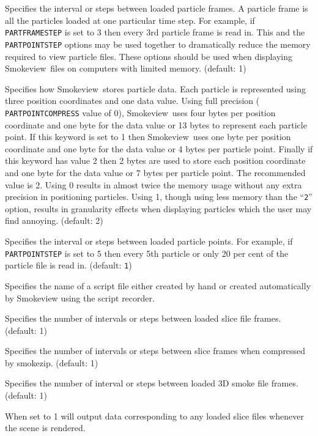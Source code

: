 \documentclass[11pt,twoside]{book}
\newcommand{\smokeview}{{Smokeview}}
\newcommand{\hitem}[1]{\item[{\bf #1} \hfill]}
\begin{document}
\hitem{PARTFRAMESTEP}Specifies the
interval or steps between loaded particle frames.  A particle frame
is all the particles loaded at one particular time step.
For example, if {\tt PARTFRAMESTEP} is set to 3 then every 3rd particle frame
is read in.
This and the {\tt PARTPOINTSTEP} options may be used together to dramatically
reduce the memory required to view particle  files.  These options should be used
when displaying \smokeview\ files on computers with limited memory.
(default: 1)

\hitem{PARTPOINTCOMPRESS}Specifies how \smokeview\ stores particle
data. Each particle is represented using three position
coordinates and one data value.  Using full precision ({\tt
PARTPOINTCOMPRESS} value of 0), \smokeview\ uses four bytes per
position coordinate and one byte for the data value or 13 bytes to
represent each particle point. If this keyword is set to 1 then
\smokeview\ uses one byte per position coordinate and one byte for
the data value or 4 bytes per particle point.  Finally if this
keyword has value 2 then 2 bytes are used to store each position
coordinate and one byte for the data value or 7 bytes per particle
point.  The recommended value is 2.  Using 0 results in almost
twice the memory usage without any extra precision in positioning
particles. Using 1, though using less memory than the ``{\tt 2}''
option, results in granularity effects when displaying particles
which the user may find annoying. (default: 2)

\hitem{PARTPOINTSTEP}Specifies the
interval or steps between loaded particle points.
For example, if {\tt PARTPOINTSTEP} is set to 5 then every 5th particle or
only 20 per cent of the particle file is read in.  (default: {\tt 1})

\hitem{SCRIPTFILE} Specifies the name of a script file either created by hand or created automatically
by Smokeview using the script recorder.

\hitem{SLICEFRAMESTEP}Specifies the number of
intervals or steps between loaded slice file frames.  (default: 1)

\hitem{SLICEZIPSTEP}  Specifies the number of intervals or steps between slice frames when compressed
by smokezip.  (default: 1)

\hitem{SMOKE3DFRAMESTEP}Specifies the number of
interval or steps between loaded 3D smoke file frames.  (default: 1)

\hitem{SMOKE3DZIPSTEPxxx}

\hitem{SLICEDATAOUT}When set to 1 will output data corresponding
to any loaded slice files whenever the scene is rendered.
\end{document}
